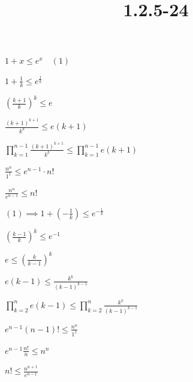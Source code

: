 \documentclass{article}
\title{1.2.5-24}
\begin{document}
\maketitle

$1 + x \leq e^x\quad (1)$

$1 + \frac{1}{k} \leq e^{\frac{1}{k}}$

$(\frac{k+1}{k})^k \leq e$

$\frac{(k+1)^{k+1}}{k^k} \leq e (k+1)$

$\prod_{k=1}^{n-1} \frac{(k+1)^{k+1}}{k^k} \leq \prod_{k=1}^{n-1} e (k+1)$

$\frac{n^n}{1^1} \leq e^{n-1} \cdot n!$

$\frac{n^n}{e^{n-1}} \leq n!$

$(1) \implies 1 + (-\frac{1}{k}) \leq e^{-\frac{1}{k}}$

$(\frac{k-1}{k})^k \leq e^{-1}$

$e \leq (\frac{k}{k-1})^k$

$e(k-1) \leq \frac{k^k}{(k-1)^{k-1}}$

$\prod_{k=2}^{n} e(k-1) \leq \prod_{k=2}^{n} \frac{k^{k}}{(k-1)^{k-1}}$

$e^{n-1} (n-1)! \leq \frac{n^n}{1^1}$

$e^{n-1} \frac{n!}{n} \leq n^n$

$n! \leq \frac{n^{n+1}}{e^{n-1}}$
\end{document}
